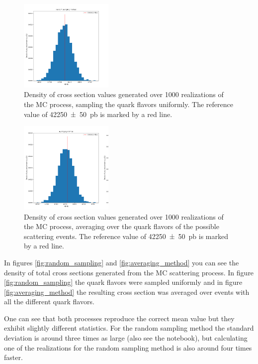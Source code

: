 \documentclass[12pt,a4paper]{scrartcl}
\begin{document}
\begin{figure}[htpb]
    \centering
    \includegraphics[width=0.4\textwidth]{figures/ex_1b_random_sampling.png}
    \caption{Density of cross section values generated over \num{1000} realizations of the MC process, sampling the quark flavors uniformly.
        The reference value of \SI{42250(50)}{\pico\barn} is marked by a red line.
    }
    \label{fig:random_sampling}
\end{figure}

\begin{figure}[htpb]
    \centering
    \includegraphics[width=0.4\textwidth]{figures/ex_1b_averaging_method.png}
    \caption{Density of cross section values generated over \num{1000} realizations of the MC process, averaging over the quark flavors of the possible scattering events.
        The reference value of \SI{42250(50)}{\pico\barn} is marked by a red line.
    }
    \label{fig:averaging_method}
\end{figure}    

In figures \eqref{fig:random_sampling} and \eqref{fig:averaging_method} you can see the density of total cross sections generated from the MC scattering process.
In figure \eqref{fig:random_sampling} the quark flavors were sampled uniformly and in figure \eqref{fig:averaging_method} the resulting cross section was averaged over events with all the different quark flavors.

One can see that both processes reproduce the correct mean value but they exhibit slightly different statistics.
For the random sampling method the standard deviation is around three times as large (also see the notebook), but calculating one of the realizations for the random sampling method is also around four times faster.
\end{document}
